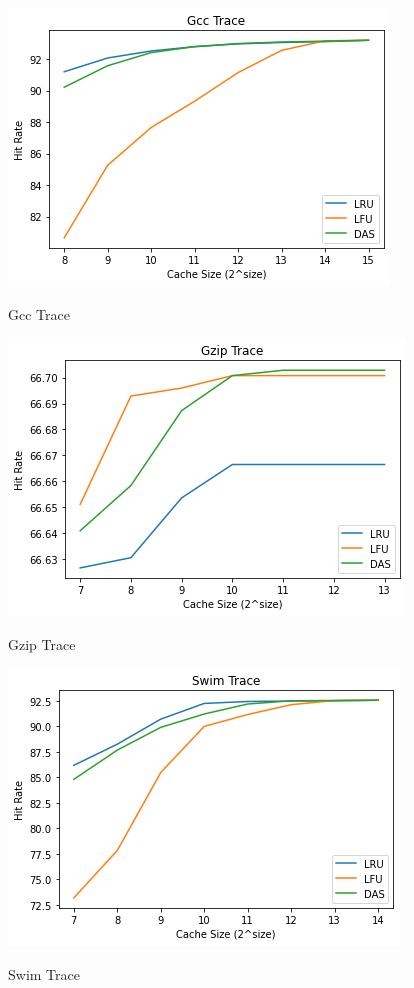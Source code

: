 \documentclass[conference]{IEEEtran}
\begin{document}
 \begin{figure}
        \centering
       \includegraphics[scale=0.6]{gcc.png}~
       \caption{Gcc Trace}\label{Fig:1}
 \end{figure}

 \begin{figure}
        \centering
       \includegraphics[scale=0.6]{gzip.png}~
       \caption{Gzip Trace}\label{Fig:1}
 \end{figure}

 \begin{figure}
        \centering
       \includegraphics[scale=0.6]{swim.png}~
       \caption{Swim Trace}\label{Fig:1}
 \end{figure}
\end{document}
